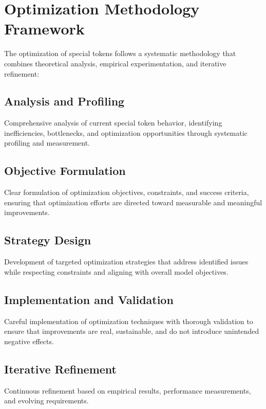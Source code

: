 \section{Optimization Methodology Framework}

The optimization of special tokens follows a systematic methodology that combines theoretical analysis, empirical experimentation, and iterative refinement:

\subsection{Analysis and Profiling}

Comprehensive analysis of current special token behavior, identifying inefficiencies, bottlenecks, and optimization opportunities through systematic profiling and measurement.

\subsection{Objective Formulation}

Clear formulation of optimization objectives, constraints, and success criteria, ensuring that optimization efforts are directed toward measurable and meaningful improvements.

\subsection{Strategy Design}

Development of targeted optimization strategies that address identified issues while respecting constraints and aligning with overall model objectives.

\subsection{Implementation and Validation}

Careful implementation of optimization techniques with thorough validation to ensure that improvements are real, sustainable, and do not introduce unintended negative effects.

\subsection{Iterative Refinement}

Continuous refinement based on empirical results, performance measurements, and evolving requirements.

